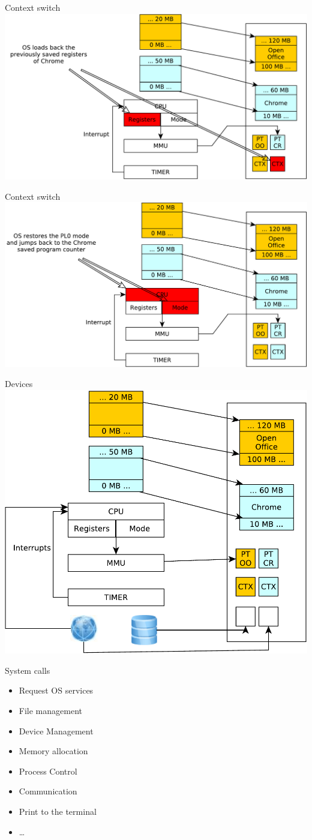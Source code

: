\documentclass{beamer}
\begin{document}
\begin{frame}{Context switch}
  \includegraphics[width=0.7\linewidth]{switch5}
\end{frame}
\begin{frame}{Context switch}
  \includegraphics[width=0.7\linewidth]{switch6}
\end{frame}

\begin{frame}{Devices}
  \includegraphics[width=0.7\linewidth]{network}
\end{frame}

\begin{frame}{System calls}
    \begin{itemize}
    \item Request OS services
    \item File management
    \item Device Management
    \item Memory allocation
    \item Process Control
    \item Communication
    \item Print to the terminal
    \item \dots
    \end{itemize}
\end{frame}
\end{document}
